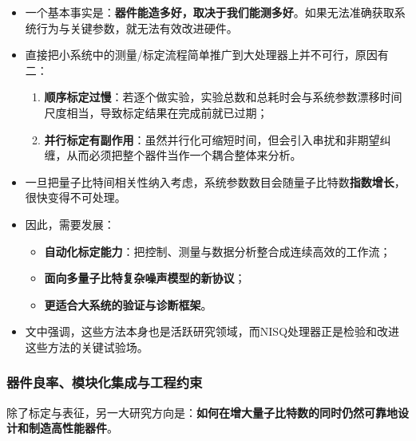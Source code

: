 \documentclass[12pt,a4paper,oneside]{ctexbook}
\begin{document}
\begin{itemize}
    \item 一个基本事实是：\textbf{器件能造多好，取决于我们能测多好}。如果无法准确获取系统行为与关键参数，就无法有效改进硬件。
    
    \item 直接把小系统中的测量/标定流程简单推广到大处理器上并不可行，原因有二：
    \begin{enumerate}
        \item \textbf{顺序标定过慢}：若逐个做实验，实验总数和总耗时会与系统参数漂移时间尺度相当，导致标定结果在完成前就已过期；
        \item \textbf{并行标定有副作用}：虽然并行化可缩短时间，但会引入串扰和非期望纠缠，从而必须把整个器件当作一个耦合整体来分析。
    \end{enumerate}
    
    \item 一旦把量子比特间相关性纳入考虑，系统参数数目会随量子比特数\textbf{指数增长}，很快变得不可处理。
    
    \item 因此，需要发展：
    \begin{itemize}
        \item \textbf{自动化标定能力}：把控制、测量与数据分析整合成连续高效的工作流；
        \item \textbf{面向多量子比特复杂噪声模型的新协议}；
        \item \textbf{更适合大系统的验证与诊断框架}。
    \end{itemize}
    
    \item 文中强调，这些方法本身也是活跃研究领域，而NISQ处理器正是检验和改进这些方法的关键试验场。
\end{itemize}

\subsubsection{器件良率、模块化集成与工程约束}

除了标定与表征，另一大研究方向是：\textbf{如何在增大量子比特数的同时仍然可靠地设计和制造高性能器件}。
\end{document}
